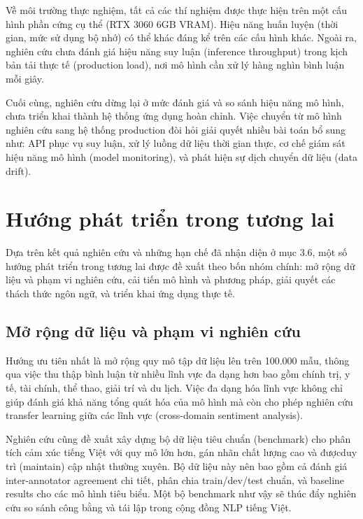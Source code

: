 \documentclass[14pt, a4paper]{report}
\begin{document}
Về môi trường thực nghiệm, tất cả các thí nghiệm được thực hiện trên một cấu hình phần cứng cụ thể (RTX 3060 6GB VRAM). Hiệu năng huấn luyện (thời gian, mức sử dụng bộ nhớ) có thể khác đáng kể trên các cấu hình khác. Ngoài ra, nghiên cứu chưa đánh giá hiệu năng suy luận (inference throughput) trong kịch bản tải thực tế (production load), nơi mô hình cần xử lý hàng nghìn bình luận mỗi giây.


Cuối cùng, nghiên cứu dừng lại ở mức đánh giá và so sánh hiệu năng mô hình, chưa triển khai thành hệ thống ứng dụng hoàn chỉnh. Việc chuyển từ mô hình nghiên cứu sang hệ thống production đòi hỏi giải quyết nhiều bài toán bổ sung như: API phục vụ suy luận, xử lý luồng dữ liệu thời gian thực, cơ chế giám sát hiệu năng mô hình (model monitoring), và phát hiện sự dịch chuyển dữ liệu (data drift).


\section{Hướng phát triển trong tương lai}


Dựa trên kết quả nghiên cứu và những hạn chế đã nhận diện ở mục 3.6, một số hướng phát triển trong tương lai được đề xuất theo bốn nhóm chính: mở rộng dữ liệu và phạm vi nghiên cứu, cải tiến mô hình và phương pháp, giải quyết các thách thức ngôn ngữ, và triển khai ứng dụng thực tế.


\subsection{Mở rộng dữ liệu và phạm vi nghiên cứu}


Hướng ưu tiên nhất là mở rộng quy mô tập dữ liệu lên trên 100.000 mẫu, thông qua việc thu thập bình luận từ nhiều lĩnh vực đa dạng hơn bao gồm chính trị, y tế, tài chính, thể thao, giải trí và du lịch. Việc đa dạng hóa lĩnh vực không chỉ giúp đánh giá khả năng tổng quát hóa của mô hình mà còn cho phép nghiên cứu transfer learning giữa các lĩnh vực (cross-domain sentiment analysis).


Nghiên cứu cũng đề xuất xây dựng bộ dữ liệu tiêu chuẩn (benchmark) cho phân tích cảm xúc tiếng Việt với quy mô lớn hơn, gán nhãn chất lượng cao và đượcduy trì (maintain) cập nhật thường xuyên. Bộ dữ liệu này nên bao gồm cả đánh giá inter-annotator agreement chi tiết, phân chia train/dev/test chuẩn, và baseline results cho các mô hình tiêu biểu. Một bộ benchmark như vậy sẽ thúc đẩy nghiên cứu so sánh công bằng và tái lập trong cộng đồng NLP tiếng Việt.
\end{document}
